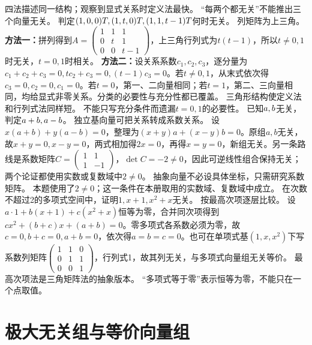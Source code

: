 {四法描述同一结构；观察到显式关系时定义法最快。}
{“每两个都无关”不能推出三个向量无关。}
{判定$(1,0,0)T,(1,t,0)T,(1,1,t-1)T$何时无关。}
{列矩阵为上三角。}
{\textbf{方法一：}拼列得到$A=\begin{pmatrix}1&1&1\\0&t&1\\0&0&t-1\end{pmatrix}$，上三角行列式为$t(t-1)$，所以$t\ne0,1$时无关，$t=0,1$时相关。
\textbf{方法二：}设关系系数$c_1,c_2,c_3$，逐分量为$c_1+c_2+c_3=0,tc_2+c_3=0,(t-1)c_3=0$。若$t\ne0,1$，从末式依次得$c_3=0,c_2=0,c_1=0$。若$t=0$，第一、二向量相同；若$t=1$，第二、三向量相同，均给显式非零关系。分类的必要性与充分性都已覆盖。}
{三角形结构使定义法和行列式法同样短。}
{不能只写充分条件而遗漏$t=0,1$的必要性。}
{已知$a,b$无关，判定$a+b,a-b$。}
{独立基向量可把关系转成系数关系。}
{设$x(a+b)+y(a-b)=0$，整理为$(x+y)a+(x-y)b=0$。原组$a,b$无关，故$x+y=0,x-y=0$，两式相加得$2x=0$，再得$x=y=0$，新组无关。另一条路线是系数矩阵$C=\begin{pmatrix}1&1\\1&-1\end{pmatrix}$，$\det C=-2\ne0$，因此可逆线性组合保持无关；两个论证都使用实数或复数域中$2\ne0$。}
{抽象向量不必设具体坐标，只需研究系数矩阵。}
{本题使用了$2\ne0$；这一条件在本册取用的实数域、复数域中成立。}
{在次数不超过2的多项式空间中，证明$1,x+1,x^2+x$无关。}
{按最高次项逐层比较。}
{设$a\cdot1+b(x+1)+c(x^2+x)$恒等为零，合并同次项得到$cx^2+(b+c)x+(a+b)=0$。零多项式各系数必须为零，故$c=0,b+c=0,a+b=0$，依次得$a=b=c=0$。也可在单项式基$(1,x,x^2)$下写系数列矩阵$\begin{pmatrix}1&1&0\\0&1&1\\0&0&1\end{pmatrix}$，行列式1，故其列无关，与多项式向量组无关等价。}
{最高次项法是三角矩阵法的抽象版本。}
{“多项式等于零”表示恒等为零，不能只在一个点取值。}


\section{极大无关组与等价向量组}
